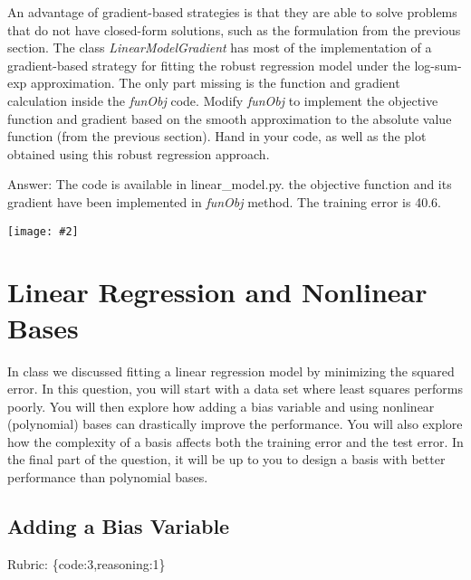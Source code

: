 \documentclass{article}
\def\rubric#1{\gre{Rubric: \{#1\}}}{}
\def\blu#1{{\color{blu}#1}}
\def\gre#1{{\color{gre}#1}}
\newcommand{\centerfig}[2]{\begin{center}\texttt{[image: \#2]}\end{center}}
\begin{document}
An advantage of gradient-based strategies is that they are able to solve
problems that do not have closed-form solutions, such as the formulation from the
previous section. The class \emph{LinearModelGradient} has most of the implementation
of a gradient-based strategy for fitting the robust regression model under the log-sum-exp approximation.
The only part missing is the function and gradient calculation inside the \emph{funObj} code.
\blu{Modify \emph{funObj} to implement the objective function and gradient based on the smooth
approximation to the absolute value function (from the previous section). Hand in your code, as well
as the plot obtained using this robust regression approach.}

\blu{Answer:} The code is available in linear\_model.py. the objective function and its gradient have been implemented in \emph{funObj} method. The training error is 40.6. \\
\centerfig{.7}{../figs/least_squares_robust.pdf}

\section{Linear Regression and Nonlinear Bases}

In class we discussed fitting a linear regression model by minimizing the squared error.
In this question, you will start with a data set where least squares performs poorly.
You will then explore how adding a bias variable and using nonlinear (polynomial) bases can drastically improve the performance.
You will also explore how the complexity of a basis affects both the training error and the test error.
In the final part of the question, it will be up to you to design a basis with better performance than polynomial bases.

\subsection{Adding a Bias Variable}
\rubric{code:3,reasoning:1}
\end{document}
